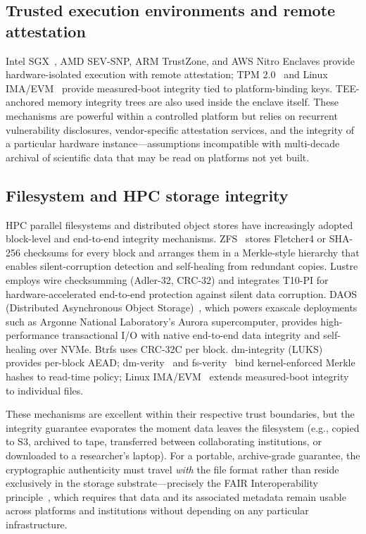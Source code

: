 \documentclass[11pt]{article}
\begin{document}
\subsection{Trusted execution environments and remote attestation}

Intel SGX~\cite{costan2016sgx}, AMD SEV-SNP, ARM TrustZone, and AWS Nitro
Enclaves provide hardware-isolated execution with remote attestation; TPM
2.0~\cite{tpm2} and Linux IMA/EVM~\cite{sailer2004ima} provide measured-boot
integrity tied to platform-binding keys. TEE-anchored memory integrity trees
are also used inside the enclave itself. These mechanisms are powerful within
a controlled platform but relies on recurrent vulnerability disclosures,
vendor-specific attestation services, and the integrity of a particular
hardware instance---assumptions incompatible with multi-decade archival of
scientific data that may be read on platforms not yet built.

\subsection{Filesystem and HPC storage integrity}

HPC parallel filesystems and distributed object stores have increasingly
adopted block-level and end-to-end integrity mechanisms.
ZFS~\cite{bonwick2003zfs} stores Fletcher4 or SHA-256 checksums for every
block and arranges them in a Merkle-style hierarchy that enables
silent-corruption detection and self-healing from redundant copies. Lustre
employs wire checksumming (Adler-32, CRC-32) and integrates T10-PI for
hardware-accelerated end-to-end protection against silent data corruption.
DAOS (Distributed Asynchronous Object Storage)~\cite{daos2020}, which powers
exascale deployments such as Argonne National Laboratory's Aurora
supercomputer, provides high-performance transactional I/O with native
end-to-end data integrity and self-healing over NVMe. Btrfs uses CRC-32C per
block. dm-integrity (LUKS) provides per-block AEAD; dm-verity~\cite{dmverity}
and fs-verity~\cite{fsverity} bind kernel-enforced Merkle hashes to
read-time policy; Linux IMA/EVM~\cite{sailer2004ima} extends measured-boot
integrity to individual files.

These mechanisms are excellent within their respective trust boundaries, but
the integrity guarantee evaporates the moment data leaves the filesystem (e.g.,
copied to S3, archived to tape, transferred between collaborating institutions,
or downloaded to a researcher's laptop). For a portable, archive-grade
guarantee, the cryptographic authenticity must travel \emph{with} the file
format rather than reside exclusively in the storage substrate---precisely
the FAIR Interoperability principle~\cite{wilkinson2016fair}, which requires
that data and its associated metadata remain usable across platforms and
institutions without depending on any particular infrastructure.
\end{document}
